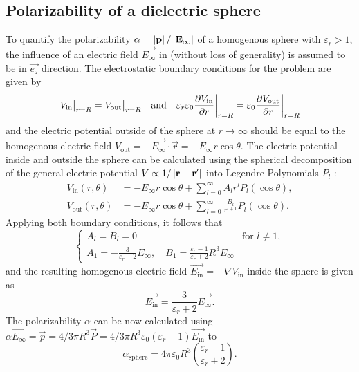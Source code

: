 \subsection{Polarizability of a dielectric sphere}
To quantify the polarizability $\alpha = \abs{\vec{p}}/\abs{\vec{E_\infty}}$ of a homogenous sphere with $\varepsilon_r > 1$, the influence of an electric field $\vec{E_\infty}$ in (without loss of generality) is assumed to be in $\vec{e_z}$ direction.
The electrostatic boundary conditions for the problem are given by
\begin{equation}
  V_\mathrm{in} \big|_{r=R} = V_\mathrm{out} \big|_{r=R} 
  \quad \text{and} \quad 
  \varepsilon_r\varepsilon_0\pdv{V_\mathrm{in}}{r}\bigg|_{r=R} = \varepsilon_0\pdv{V_\mathrm{out}}{r} \bigg|_{r=R}
\end{equation}
and the electric potential outside of the sphere at $r\rightarrow\infty$ should be equal to the homogenous electric field $V_\mathrm{out} = -\vec{E_\infty} \cdot \vec{r} = -E_\infty r\cos\theta$.
The electric potential inside and outside the sphere can be calculated using the spherical decomposition of the general electric potential $V \propto 1/\abs{\vec{r} - \vec{r'}}$ into Legendre Polynomials $P_l$ \cite[p. 188-190]{Griffiths_2018}:
\begin{align}
  V_\mathrm{in}(r, \theta) &= -E_\infty r\cos\theta + \sum_{l=0}^{\infty} A_l r^l P_l(\cos\theta), \\
  V_\mathrm{out}(r, \theta) &= -E_\infty r \cos\theta + \sum_{l=0}^{\infty} \frac{B_l}{r^{l+1}} P_l(\cos\theta).
\end{align}
Applying both boundary conditions, it follows that \cite[p. 249-251]{Griffiths_2018}
\begin{equation}
  \begin{cases}
    A_l = B_l = 0 & \text{for } l \neq 1, \\
  A_1 = -\frac{3}{\varepsilon_r + 2}E_\infty, \quad B_1 = \frac{\varepsilon_r-1}{\varepsilon_r + 2}R^3E_\infty
  \end{cases}
\end{equation}
and the resulting  homogenous electric field $\vec{E_\mathrm{in}} = -\nabla V_\mathrm{in}$ inside the sphere is given as
\begin{equation}
  \vec{E_\mathrm{in}} = \frac{3}{\varepsilon_r + 2} \vec{E_\infty} .
\end{equation}
The polarizability $\alpha$ can be now calculated using $\alpha \vec{E_\infty} = \vec{p} = 4/3 \pi R^3 \vec{P} = 4/3 \pi R^3 \varepsilon_0(\varepsilon_r - 1)\vec{E_\mathrm{in}}$ to
\begin{equation}
  \alpha_\mathrm{sphere} = 4\pi \varepsilon_0 R^3 \left(\frac{\varepsilon_r - 1}{\varepsilon_r + 2}\right).
\end{equation}

